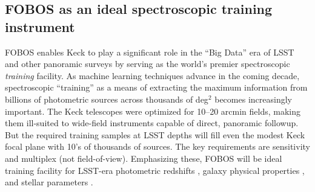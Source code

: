 
\subsection{FOBOS as an ideal spectroscopic training instrument}
\label{sec:datascience}

FOBOS enables Keck to play a significant role in the ``Big Data'' era of LSST and other panoramic surveys by serving as the world's premier spectroscopic \emph{training} facility.  As machine learning techniques advance in the coming decade,  spectroscopic ``training'' as a means of extracting the maximum information from billions of photometric sources across thousands of deg$^2$ becomes increasingly important.  The Keck telescopes were optimized for 10--20 arcmin fields, making them ill-suited to wide-field instruments capable of direct, panoramic followup.  But the required training samples at LSST depths will fill even the modest Keck focal plane with 10's of thousands of sources.  The key requirements are sensitivity and multiplex (not field-of-view).  Emphasizing these, FOBOS will be ideal training facility for LSST-era photometric redshifts \citep[see][]{salvato19}, galaxy physical properties \citep[e.g.,][]{davidzon19}, and stellar parameters \citep[e.g.,][]{2018arXiv180401530T}.





